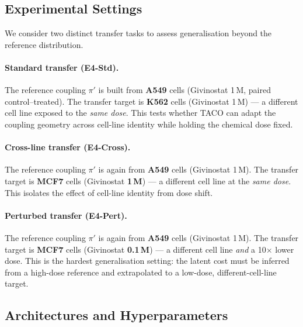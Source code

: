 \documentclass[11pt]{article}
\theoremstyle{definition}
\numberwithin{equation}{section}%
\begin{document}
\subsection{Experimental Settings}

We consider two distinct transfer tasks to assess generalisation beyond the reference distribution.

\paragraph{Standard transfer (E4-Std).}
The reference coupling $\pi'$ is built from \textbf{A549} cells (Givinostat 1\,\textmu M, paired control--treated).
The transfer target is \textbf{K562} cells (Givinostat 1\,\textmu M) --- a different cell line exposed to the \emph{same dose}.
This tests whether TACO can adapt the coupling geometry across cell-line identity while holding the chemical dose fixed.

\paragraph{Cross-line transfer (E4-Cross).}
The reference coupling $\pi'$ is again from \textbf{A549} cells (Givinostat 1\,\textmu M).
The transfer target is \textbf{MCF7} cells (Givinostat \textbf{1\,\textmu M}) --- a different cell line at the \emph{same dose}.
This isolates the effect of cell-line identity from dose shift.

\paragraph{Perturbed transfer (E4-Pert).}
The reference coupling $\pi'$ is again from \textbf{A549} cells (Givinostat 1\,\textmu M).
The transfer target is \textbf{MCF7} cells (Givinostat \textbf{0.1\,\textmu M}) --- a different cell line \emph{and} a 10$\times$ lower dose.
This is the hardest generalisation setting: the latent cost must be inferred from a high-dose reference and extrapolated to a low-dose, different-cell-line target.

\subsection{Architectures and Hyperparameters}
\end{document}
